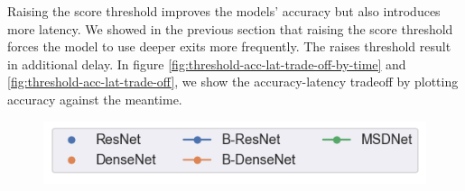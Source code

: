 Raising the score threshold improves the models' accuracy but also introduces more latency. We showed in the previous section that raising the score threshold forces the model to use deeper exits more frequently. The raises threshold result in additional delay. In figure \ref{fig:threshold-acc-lat-trade-off-by-time} and \ref{fig:threshold-acc-lat-trade-off}, we show the accuracy-latency tradeoff by plotting accuracy against the meantime.


\begin{figure}
	\captionsetup[subfigure]{justification=centering,farskip=0pt,captionskip=0pt}
	\centering
	\includegraphics[width=.4\linewidth]{figures/threshold_plots/inference_by_time_legend}
	\\
	\hfill
	\hfill

\end{figure}
